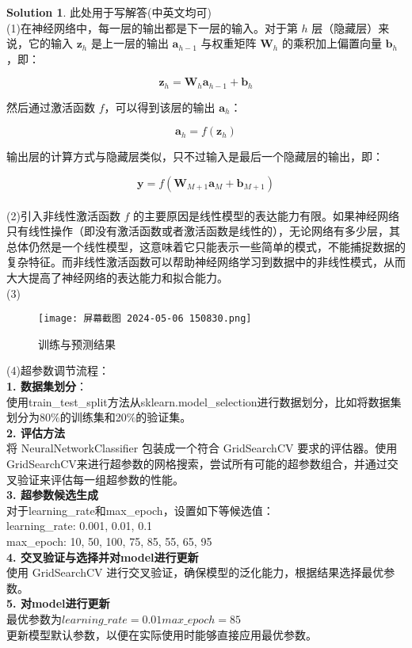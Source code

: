 \documentclass[a4paper,UTF8]{article}
\numberwithin{equation}{section}
\theoremstyle{definition}
\newtheorem*{solution}{Solution}
\begin{document}
\begin{solution} 此处用于写解答(中英文均可)
    ~\\
(1)在神经网络中，每一层的输出都是下一层的输入。对于第 $h$ 层（隐藏层）来说，它的输入 $\mathbf{z}_h$ 是上一层的输出 $\mathbf{a}_{h-1}$ 与权重矩阵 $\mathbf{W}_h$ 的乘积加上偏置向量 $\mathbf{b}_h$，即：

$$\mathbf{z}_h = \mathbf{W}_h \mathbf{a}_{h-1} + \mathbf{b}_h$$

然后通过激活函数 $f$，可以得到该层的输出 $\mathbf{a}_h$：

$$\mathbf{a}_h = f(\mathbf{z}_h)$$

输出层的计算方式与隐藏层类似，只不过输入是最后一个隐藏层的输出，即：

$$\mathbf{y} = f(\mathbf{W}_{M+1} \mathbf{a}_M + \mathbf{b}_{M+1})$$\\
(2)引入非线性激活函数 $f$ 的主要原因是线性模型的表达能力有限。如果神经网络只有线性操作（即没有激活函数或者激活函数是线性的），无论网络有多少层，其总体仍然是一个线性模型，这意味着它只能表示一些简单的模式，不能捕捉数据的复杂特征。而非线性激活函数可以帮助神经网络学习到数据中的非线性模式，从而大大提高了神经网络的表达能力和拟合能力。\\
(3)
 \begin{figure}[H]
    \centering
    \texttt{[image: 屏幕截图 2024-05-06 150830.png]}\\
    \caption{训练与预测结果}
    \label{fig:roc}
\end{figure}
(4)超参数调节流程：\\
\textbf{1. 数据集划分}：\\
使用train\_test\_split方法从sklearn.model\_selection进行数据划分，比如将数据集划分为80$\%$的训练集和20$\%$的验证集。\\
\textbf{2. 评估方法}\\
将 NeuralNetworkClassifier 包装成一个符合 GridSearchCV 要求的评估器。使用GridSearchCV来进行超参数的网格搜索，尝试所有可能的超参数组合，并通过交叉验证来评估每一组超参数的性能。\\
\textbf{3. 超参数候选生成}\\
对于learning\_rate和max\_epoch，设置如下等候选值：\\
learning\_rate: 0.001, 0.01, 0.1\\
max\_epoch: 10, 50, 100, 75, 85, 55, 65, 95\\
\textbf{4. 交叉验证与选择并对model进行更新}\\
使用 GridSearchCV 进行交叉验证，确保模型的泛化能力，根据结果选择最优参数。\\
\textbf{5. 对model进行更新}\\
最优参数为$learning\_rate=0.01 max\_epoch=85$\\
更新模型默认参数，以便在实际使用时能够直接应用最优参数。
\end{solution}
\end{document}
